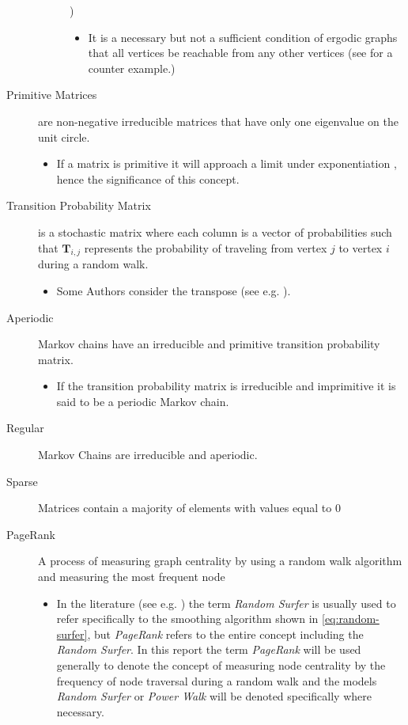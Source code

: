 \documentclass[11pt]{report}
\begin{document}
\begin{description}
\begin{description}
\cite{nathanaelackermancameronfreeralexkruckmanandrehanapatelProperlyErodicStructures2017,chenEigenvaluesInequalitiesErgodic2005})
\begin{itemize}
\item It is a necessary but not a sufficient condition of ergodic graphs that all vertices be reachable from any other vertices (see \cite{sazProbabilityTheoryThis} for a counter example.)
\end{itemize}
\end{description}
\item[{Primitive Matrices}] are non-negative irreducible matrices that have only one eigenvalue on the unit circle.
\begin{itemize}
\item If a matrix is primitive it will approach a limit under exponentiation \cite[]{langvilleGooglePageRankScience2012}, hence the significance of this concept.
\end{itemize}
\item[{Transition Probability Matrix}] is a stochastic matrix where each column is a vector of probabilities such that \(\mathbf{T}_{i,j}\) represents the probability of traveling from vertex \(j\) to vertex \(i\) during a random walk.
\begin{itemize}
\item Some Authors consider the transpose (see e.g. \cite{langvilleGooglePageRankScience2012}).
\end{itemize}
\item[{Aperiodic}] Markov chains have an irreducible and primitive transition probability matrix.
\begin{itemize}
\item If the transition probability matrix is irreducible and imprimitive it is said to be a periodic Markov chain.
\end{itemize}
\item[{Regular}] Markov Chains are irreducible and aperiodic.
\item[{Sparse}] Matrices contain a majority of elements with values equal to 0 \cite[]{langvilleGooglePageRankScience2012}
\item[{PageRank}] A process of measuring graph centrality by using a random walk algorithm and measuring the most frequent node
\begin{itemize}
\item In the literature (see e.g.
\cite{guptaWTFWhoFollow2013,langvilleGooglePageRankScience2012}) the term \emph{Random
Surfer} is usually used to refer specifically to the smoothing
algorithm shown in \eqref{eq:random-surfer}, but \emph{PageRank} refers to the entire concept including the \emph{Random Surfer}. In this report the term \emph{PageRank} will be used generally to denote the concept of measuring node centrality by the frequency of node traversal during a random walk and the models \emph{Random Surfer} or \emph{Power Walk} will be denoted specifically where necessary.
\end{itemize}
\end{description}
\end{document}
